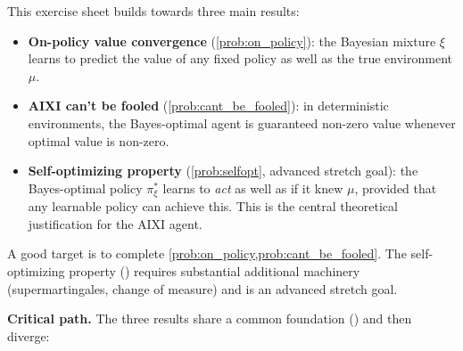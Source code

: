 \documentclass[fontsize=11pt, parskip=half]{scrartcl}
\begin{document}
This exercise sheet builds towards three main results:
\begin{itemize}\itemsep=2pt
    \item \textbf{On-policy value convergence} (\cref{prob:on_policy}): the Bayesian mixture $\xi$ learns to predict the value of any fixed policy as well as the true environment $\mu$.
    \item \textbf{AIXI can't be fooled} (\cref{prob:cant_be_fooled}): in deterministic environments, the Bayes-optimal agent is guaranteed non-zero value whenever optimal value is non-zero.
    \item \textbf{Self-optimizing property} (\cref{prob:selfopt}, advanced stretch goal): the Bayes-optimal policy $\pi_\xi^*$ learns to \emph{act} as well as if it knew $\mu$, provided that any learnable policy can achieve this. This is the central theoretical justification for the AIXI agent.
\end{itemize}
A good target is to complete \cref{prob:on_policy,prob:cant_be_fooled}. The self-optimizing property () requires substantial additional machinery (supermartingales, change of measure) and is an advanced stretch goal.

\textbf{Critical path.} The three results share a common foundation () and then diverge:
\end{document}
